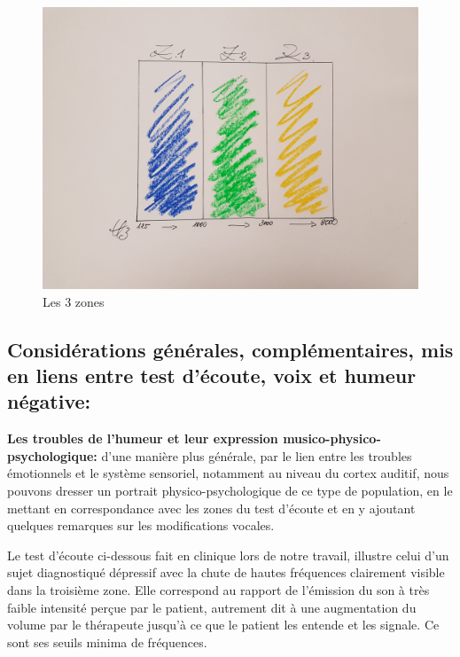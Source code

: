 \begin{figure}
	\centering
	\includegraphics[width=1\linewidth]{images/les3zones.jpg}
	\caption[Les 3 zones]{Les 3 zones}
	\label{Les trois zones du test d'écoute}
\end{figure}
 \clearpage

\subsection{Considérations générales, complémentaires, mis en liens entre test d'écoute, voix et 
humeur négative:}


\textbf{Les troubles de l'humeur et leur expression
	musico-phy\-sico-psy\-cho\-lo\-gi\-que:}
d'une manière plus générale, par le lien entre les troubles
émotionnels et le
système sensoriel, notamment au niveau du cortex auditif, nous
pouvons dresser un portrait
physico-psychologique de ce type de population,
en le mettant en correspondance avec les zones du test d'écoute et
en y ajoutant quelques remarques sur les modifications vocales.


Le test d'écoute ci-dessous fait en clinique lors de notre travail,  illustre
celui d'un sujet diagnostiqué dépressif avec la
chute  de hautes fréquences 
clairement visible dans la troisième zone. Elle correspond au rapport de l'émission du son à
très faible intensité perçue par le
patient, autrement dit à une augmentation
du volume
par le thérapeute jusqu'à ce que le patient les entende et les signale.
Ce sont ses seuils minima de fréquences.


